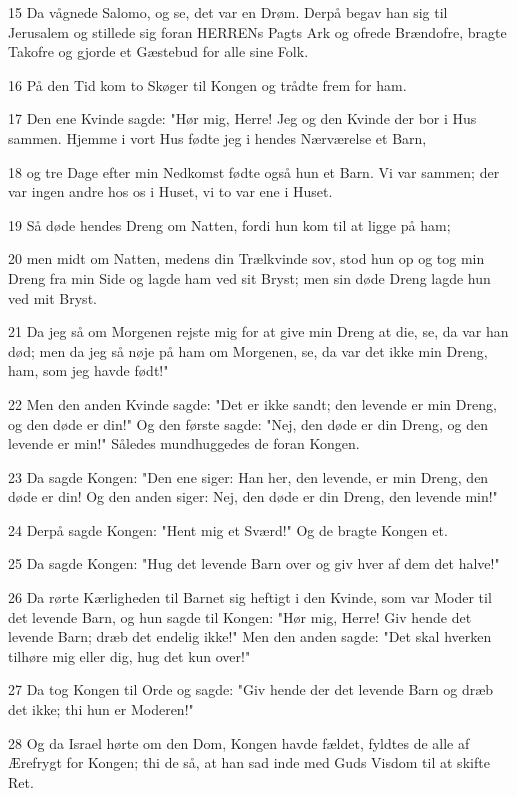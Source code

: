\par 15 Da vågnede Salomo, og se, det var en Drøm. Derpå begav han sig til Jerusalem og stillede sig foran HERRENs Pagts Ark og ofrede Brændofre, bragte Takofre og gjorde et Gæstebud for alle sine Folk.
\par 16 På den Tid kom to Skøger til Kongen og trådte frem for ham.
\par 17 Den ene Kvinde sagde: "Hør mig, Herre! Jeg og den Kvinde der bor i Hus sammen. Hjemme i vort Hus fødte jeg i hendes Nærværelse et Barn,
\par 18 og tre Dage efter min Nedkomst fødte også hun et Barn. Vi var sammen; der var ingen andre hos os i Huset, vi to var ene i Huset.
\par 19 Så døde hendes Dreng om Natten, fordi hun kom til at ligge på ham;
\par 20 men midt om Natten, medens din Trælkvinde sov, stod hun op og tog min Dreng fra min Side og lagde ham ved sit Bryst; men sin døde Dreng lagde hun ved mit Bryst.
\par 21 Da jeg så om Morgenen rejste mig for at give min Dreng at die, se, da var han død; men da jeg så nøje på ham om Morgenen, se, da var det ikke min Dreng, ham, som jeg havde født!"
\par 22 Men den anden Kvinde sagde: "Det er ikke sandt; den levende er min Dreng, og den døde er din!" Og den første sagde: "Nej, den døde er din Dreng, og den levende er min!" Således mundhuggedes de foran Kongen.
\par 23 Da sagde Kongen: "Den ene siger: Han her, den levende, er min Dreng, den døde er din! Og den anden siger: Nej, den døde er din Dreng, den levende min!"
\par 24 Derpå sagde Kongen: "Hent mig et Sværd!" Og de bragte Kongen et.
\par 25 Da sagde Kongen: "Hug det levende Barn over og giv hver af dem det halve!"
\par 26 Da rørte Kærligheden til Barnet sig heftigt i den Kvinde, som var Moder til det levende Barn, og hun sagde til Kongen: "Hør mig, Herre! Giv hende det levende Barn; dræb det endelig ikke!" Men den anden sagde: "Det skal hverken tilhøre mig eller dig, hug det kun over!"
\par 27 Da tog Kongen til Orde og sagde: "Giv hende der det levende Barn og dræb det ikke; thi hun er Moderen!"
\par 28 Og da Israel hørte om den Dom, Kongen havde fældet, fyldtes de alle af Ærefrygt for Kongen; thi de så, at han sad inde med Guds Visdom til at skifte Ret.


